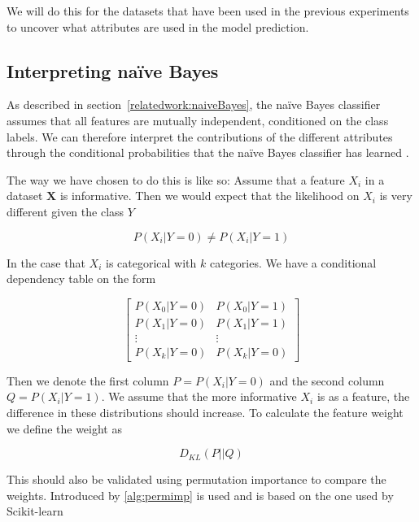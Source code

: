 We will do this for the datasets that have been used in the previous experiments to uncover what attributes are used in the model prediction.

\subsection{Interpreting naïve Bayes}

As described in section~\ref{relatedwork:naiveBayes}, the naïve Bayes classifier assumes that all features are mutually independent, conditioned on the class labels. We can therefore interpret the contributions of the different attributes through the conditional probabilities that the naïve Bayes classifier has learned \cite[p.~142]{Molnar:2020:Book}.

The way we have chosen to do this is like so: Assume that a feature $X_i$ in a dataset $\boldsymbol{X}$ is informative. Then we would expect that the likelihood on $X_i$ is very different given the class $Y$

\begin{equation*}
    P(X_i | Y = 0) \neq P(X_i | Y = 1)
\end{equation*}

In the case that $X_i$ is categorical with $k$ categories. We have a conditional dependency table on the form

\begin{equation*}
    \begin{bmatrix}
        P(X_0 | Y = 0) & P(X_0 | Y = 1) \\ 
        P(X_1 | Y = 0) & P(X_1 | Y = 1) \\
        \vdots & \vdots \\
        P(X_k | Y = 0) & P(X_k | Y = 0)
    \end{bmatrix}
\end{equation*}

Then we denote the first column $P = P(X_i | Y = 0)$ and the second column $Q = P(X_i | Y = 1)$. We assume that the more informative $X_i$ is as a feature, the difference in these distributions should increase. To calculate the feature weight we define the weight as 

\begin{equation*}
    D_{KL}(P||Q)
\end{equation*}

This should also be validated using permutation importance to compare the weights. Introduced by \ref{alg:permimp} is used and is based on the one used by Scikit-learn \cite{Pedregosa:2011:JMLR}

